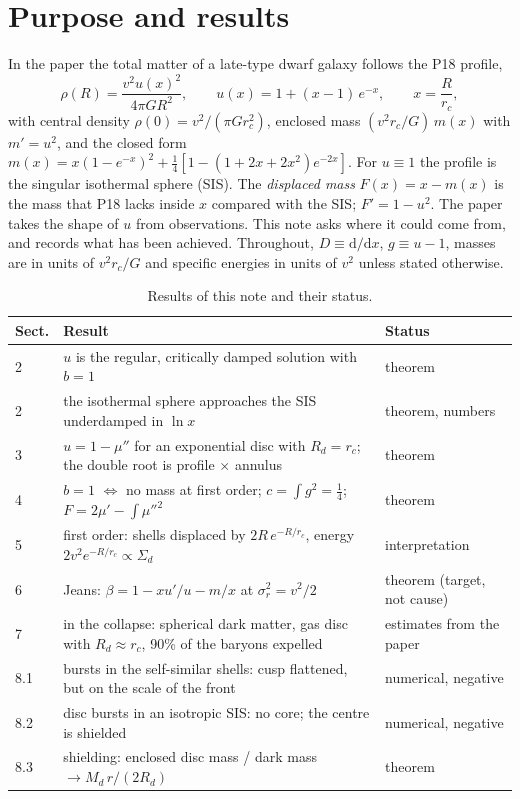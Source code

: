 \documentclass[11pt,a4paper]{article}
\theoremstyle{definition}
\theoremstyle{remark}
\newcommand{\rc}{r_c}
\newcommand{\Rd}{R_d}
\newcommand{\dd}{\mathrm{d}}
\begin{document}
\section{Purpose and results}\label{sec:intro}

In the paper the total matter of a late-type dwarf galaxy follows the P18 profile,
\begin{equation}
  \rho(R)=\frac{v^2u(x)^2}{4\pi GR^2},\qquad u(x)=1+(x-1)\,e^{-x},\qquad x=\frac{R}{\rc},
  \label{eq:p18}
\end{equation}
with central density $\rho(0)=v^2/(\pi G\rc^2)$, enclosed mass $(v^2\rc/G)\,m(x)$ with
$m'=u^2$, and the closed form
$m(x)=x(1-e^{-x})^2+\tfrac14[1-(1+2x+2x^2)e^{-2x}]$. For $u\equiv1$ the profile is the
singular isothermal sphere (SIS). The \emph{displaced mass} $F(x)=x-m(x)$ is the mass that
P18 lacks inside $x$ compared with the SIS; $F'=1-u^2$. The paper takes the shape of $u$
from observations. This note asks where it could come from, and records what has been
achieved. Throughout, $D\equiv\dd/\dd x$, $g\equiv u-1$, masses are in units of $v^2\rc/G$
and specific energies in units of $v^2$ unless stated otherwise.

\begin{table}[h]
\centering\small
\caption{Results of this note and their status.}
\label{tab:results}
\begin{tabular}{@{}p{}p{}p{}@{}}
\toprule
Sect. & Result & Status\\
\midrule
2 & $u$ is the regular, critically damped solution with $b=1$ & theorem\\
2 & the isothermal sphere approaches the SIS underdamped in $\ln x$ & theorem, numbers\\
3 & $u=1-\mu''$ for an exponential disc with $\Rd=\rc$; the double root is profile $\times$ annulus & theorem\\
4 & $b=1$ $\Leftrightarrow$ no mass at first order; $c=\int g^2=\tfrac14$; $F=2\mu'-\int\mu''^2$ & theorem\\
5 & first order: shells displaced by $2R\,e^{-R/\rc}$, energy $2v^2e^{-R/\rc}\propto\Sigma_d$ & interpretation\\
6 & Jeans: $\beta=1-xu'/u-m/x$ at $\sigma_r^2=v^2/2$ & theorem (target, not cause)\\
7 & in the collapse: spherical dark matter, gas disc with $\Rd\approx\rc$, 90\% of the baryons expelled & estimates from the paper\\
8.1 & bursts in the self-similar shells: cusp flattened, but on the scale of the front & numerical, negative\\
8.2 & disc bursts in an isotropic SIS: no core; the centre is shielded & numerical, negative\\
8.3 & shielding: enclosed disc mass / dark mass $\to M_d\,r/(2\Rd)$ & theorem\\
\bottomrule
\end{tabular}
\end{table}
\end{document}
